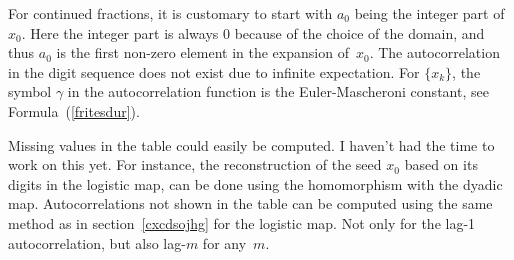 \documentclass[oneside,10pt]{book}
\begin{document}
For continued fractions, it is customary to start with $a_0$ being the integer part of $x_0$. Here the integer part is always $0$ because of the choice of the domain, and thus $a_0$ is the first non-zero element in the expansion of~$x_0$. The autocorrelation in the digit sequence does not exist due to infinite expectation. For $\{x_k\}$, the symbol $\gamma$ in the autocorrelation function is the Euler-Mascheroni constant,
 see Formula~(\ref{fritesdur}).

Missing values in the table could easily be computed. I haven't had the time to work on this yet. For instance, 
 the reconstruction of the seed $x_0$ based on its digits in the logistic map, can be done using the homomorphism with the dyadic map. 
 Autocorrelations not shown in the table can be computed using the same method as in section~\ref{cxcdsojhg} for the logistic map. Not only for the lag-1 autocorrelation, but also lag-$m$ for any~$m$. 
\end{document}
